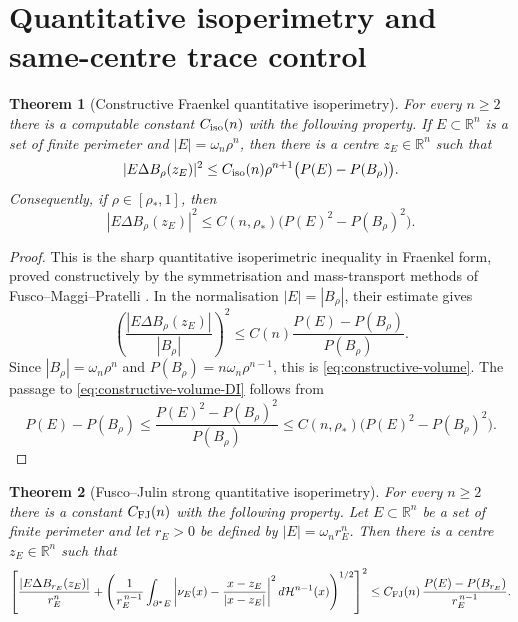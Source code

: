 \documentclass[11pt]{amsart}
\newtheorem{theorem}{Theorem}[section]
\theoremstyle{definition}
\newcommand{\R}{\mathbb R}
\newcommand{\rstar}{\rho_*}
\newcommand{\Hn}{\mathcal H^{n-1}}
\newcommand{\Per}{P}
\begin{document}
\section{Quantitative isoperimetry and same-centre trace control}
\label{sec:samecentre}

\begin{theorem}[Constructive Fraenkel quantitative isoperimetry]
\label{thm:constructive-fraenkel}
For every \(n\ge2\) there is a computable constant
\(C_{\rm iso}(n)\) with the following property.  If
\(E\subset\R^n\) is a set of finite perimeter and
\(|E|=\omega_n\rho^n\), then there is a centre \(z_E\in\R^n\) such that
\begin{equation}\label{eq:constructive-volume}
   |E\Delta B_\rho(z_E)|^2
   \le
   C_{\rm iso}(n)\rho^{n+1}\bigl(\Per(E)-\Per(B_\rho)\bigr).
\end{equation}
Consequently, if \(\rho\in[\rstar,1]\), then
\begin{equation}\label{eq:constructive-volume-DI}
   |E\Delta B_\rho(z_E)|^2
   \le C(n,\rstar)\bigl(\Per(E)^2-\Per(B_\rho)^2\bigr).
\end{equation}
\end{theorem}

\begin{proof}
This is the sharp quantitative isoperimetric inequality in Fraenkel form,
proved constructively by the symmetrisation and mass-transport methods of
Fusco--Maggi--Pratelli \cite{FMP}.  In the normalisation
\(|E|=|B_\rho|\), their estimate gives
\[
   \left(\frac{|E\Delta B_\rho(z_E)|}{|B_\rho|}\right)^2
   \le C(n)\frac{\Per(E)-\Per(B_\rho)}{\Per(B_\rho)} .
\]
Since \(|B_\rho|=\omega_n\rho^n\) and
\(\Per(B_\rho)=n\omega_n\rho^{n-1}\), this is
\eqref{eq:constructive-volume}.  The passage to
\eqref{eq:constructive-volume-DI} follows from
\[
   \Per(E)-\Per(B_\rho)
   \le \frac{\Per(E)^2-\Per(B_\rho)^2}{\Per(B_\rho)}
   \le C(n,\rstar)\bigl(\Per(E)^2-\Per(B_\rho)^2\bigr).
\]
\end{proof}

\begin{theorem}[Fusco--Julin strong quantitative isoperimetry]
\label{thm:FJ-strong}
For every \(n\ge2\) there is a constant \(C_{\rm FJ}(n)\) with the
following property.  Let \(E\subset\R^n\) be a set of finite perimeter and
let \(r_E>0\) be defined by \(|E|=\omega_n r_E^n\).  Then there is a
centre \(z_E\in\R^n\) such that
\begin{equation}\label{eq:FJ-exact}
   \left[
      \frac{|E\Delta B_{r_E}(z_E)|}{r_E^n}
      +
      \left(
         \frac1{r_E^{\,n-1}}
         \int_{\partial^*E}
            \left|\nu_E(x)-\frac{x-z_E}{|x-z_E|}\right|^2
         d\Hn(x)
      \right)^{1/2}
   \right]^2
   \le
   C_{\rm FJ}(n)\,
   \frac{\Per(E)-\Per(B_{r_E})}{r_E^{\,n-1}} .
\end{equation}
\end{theorem}
\end{document}
